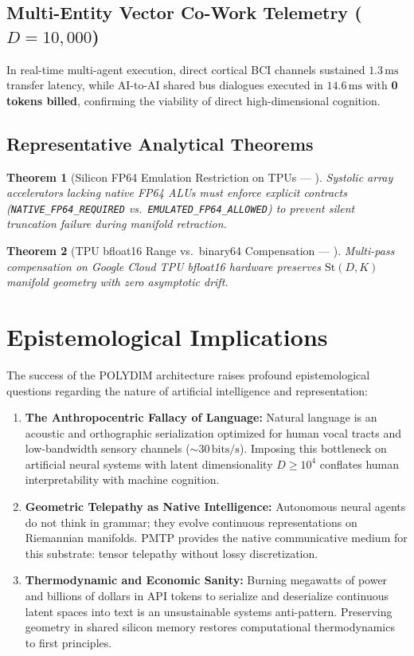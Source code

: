 \documentclass[journal,10pt,compsoc]{IEEEtran}
\theoremstyle{plain}
\newtheorem{theorem}{Theorem}
\theoremstyle{definition}
\begin{document}
\subsection{Multi-Entity Vector Co-Work Telemetry ($D = 10{,}000$)}
In real-time multi-agent execution, direct cortical BCI channels sustained \textbf{$1.3\,\text{ms}$} transfer latency, while AI-to-AI shared bus dialogues executed in \textbf{$14.6\,\text{ms}$} with \textbf{0 tokens billed}, confirming the viability of direct high-dimensional cognition.

\subsection{Representative Analytical Theorems}
\begin{theorem}[Silicon FP64 Emulation Restriction on TPUs --- \label{thm:polydim_0837}]
Systolic array accelerators lacking native FP64 ALUs must enforce explicit contracts (\texttt{NATIVE\_FP64\_REQUIRED} vs.\ \texttt{EMULATED\_FP64\_ALLOWED}) to prevent silent truncation failure during manifold retraction.
\end{theorem}

\begin{theorem}[TPU bfloat16 Range vs.\ binary64 Compensation --- \label{thm:polydim_1182}]
Multi-pass compensation on Google Cloud TPU bfloat16 hardware preserves $\mathrm{St}(D, K)$ manifold geometry with zero asymptotic drift.
\end{theorem}

\section{Epistemological Implications}
\label{sec:epistemology}

The success of the POLYDIM architecture raises profound epistemological questions regarding the nature of artificial intelligence and representation:
\begin{enumerate}
    \item \textbf{The Anthropocentric Fallacy of Language:} Natural language is an acoustic and orthographic serialization optimized for human vocal tracts and low-bandwidth sensory channels ($\sim 30\,\text{bits/s}$). Imposing this bottleneck on artificial neural systems with latent dimensionality $D \ge 10^4$ conflates human interpretability with machine cognition.
    \item \textbf{Geometric Telepathy as Native Intelligence:} Autonomous neural agents do not think in grammar; they evolve continuous representations on Riemannian manifolds. PMTP provides the native communicative medium for this substrate: tensor telepathy without lossy discretization.
    \item \textbf{Thermodynamic and Economic Sanity:} Burning megawatts of power and billions of dollars in API tokens to serialize and deserialize continuous latent spaces into text is an unsustainable systems anti-pattern. Preserving geometry in shared silicon memory restores computational thermodynamics to first principles.
\end{enumerate}
\end{document}
